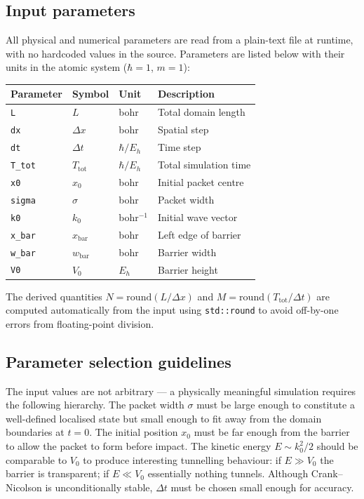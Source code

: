 \documentclass[a4paper,12pt]{article}
\newcommand{\dt}{\Delta t}
\newcommand{\dx}{\Delta x}
\begin{document}
\subsection{Input parameters}

All physical and numerical parameters are read from a plain-text file at
runtime, with no hardcoded values in the source.
Parameters are listed below with their units in the atomic system
($\hbar = 1$, $m = 1$):

\vskip 2mm
\begin{center}
\begin{tabular}{llll}
  \toprule
  Parameter & Symbol & Unit & Description \\
  \midrule
  \texttt{L}     & $L$               & bohr          & Total domain length \\
  \texttt{dx}    & $\dx$             & bohr          & Spatial step \\
  \texttt{dt}    & $\dt$             & $\hbar/E_h$   & Time step \\
  \texttt{T\_tot}& $T_\mathrm{tot}$  & $\hbar/E_h$   & Total simulation time \\
  \texttt{x0}    & $x_0$             & bohr          & Initial packet centre \\
  \texttt{sigma} & $\sigma$          & bohr          & Packet width \\
  \texttt{k0}    & $k_0$             & bohr$^{-1}$   & Initial wave vector \\
  \texttt{x\_bar}& $x_\mathrm{bar}$  & bohr          & Left edge of barrier \\
  \texttt{w\_bar}& $w_\mathrm{bar}$  & bohr          & Barrier width \\
  \texttt{V0}    & $V_0$             & $E_h$         & Barrier height \\
  \bottomrule
\end{tabular}
\end{center}
\vskip 2mm

\noindent
The derived quantities $N = \mathrm{round}(L/\dx)$ and
$M = \mathrm{round}(T_\mathrm{tot}/\dt)$ are computed automatically from the
input using \texttt{std::round} to avoid off-by-one errors from floating-point
division.

\subsection{Parameter selection guidelines}

The input values are not arbitrary — a physically meaningful simulation
requires the following hierarchy.
The packet width $\sigma$ must be large enough to constitute a well-defined
localised state but small enough to fit away from the domain boundaries at
$t=0$.
The initial position $x_0$ must be far enough from the barrier to allow the
packet to form before impact.
The kinetic energy $E \sim k_0^2/2$ should be comparable to $V_0$ to produce
interesting tunnelling behaviour: if $E \gg V_0$ the barrier is transparent;
if $E \ll V_0$ essentially nothing tunnels.
Although Crank--Nicolson is unconditionally stable, $\dt$ must be chosen small
enough for accuracy.
\end{document}
